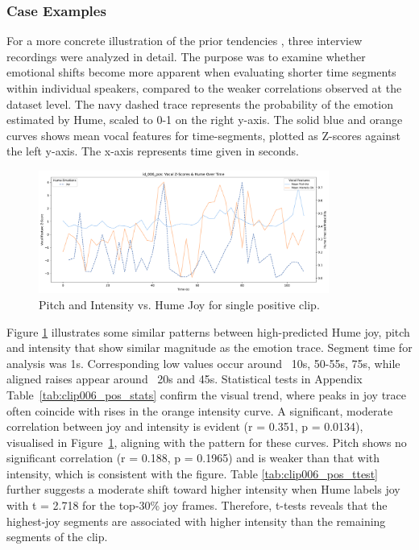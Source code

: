   


\subsubsection{Case Examples}
\label{sec:res_rq1_case}
For a more concrete illustration of the prior tendencies , three interview recordings were analyzed in detail. The purpose was to examine whether emotional shifts become more apparent when evaluating shorter time segments within individual speakers, compared to the weaker correlations observed at the dataset level.
The navy dashed trace represents the probability of the emotion estimated by Hume, scaled to 0-1 on the right y-axis. 
The solid blue and orange curves shows mean vocal features for time-segments, plotted as Z-scores against the left y-axis. The x-axis represents time given in seconds.


\medskip


\begin{figure}[H]
    \centering
    
    \includegraphics[width=0.85\textwidth]{png/results/rq3_2/combined_zscore_hume_id_006_pos_4.pdf}
    \caption{Pitch and Intensity vs. Hume Joy for single positive clip.}
    \label{fig:006_pos-joy}
\end{figure}


  Figure \ref{fig:006_pos-joy} illustrates some similar patterns between high-predicted Hume joy, pitch and intensity that show similar magnitude as the emotion trace. Segment time for analysis was 1s.
  Corresponding low values occur around ~10s, 50-55s, 75s, while aligned raises appear around ~20s and 45s. Statistical tests in Appendix Table~\ref{tab:clip006_pos_stats} confirm the visual trend, where peaks in joy trace often coincide with rises in the orange intensity curve. 
  A significant, moderate correlation between joy and intensity is evident (r = 0.351, p = 0.0134), visualised in Figure~\ref{fig:006_pos-joy}, aligning with the pattern for these curves. 
  Pitch shows no significant correlation (r = 0.188, p = 0.1965) and is weaker than that with intensity, which is consistent with the figure.
  Table \ref{tab:clip006_pos_ttest} further suggests a moderate shift toward higher intensity when Hume labels joy with t = 2.718 for the top-30\% joy frames. Therefore, t-tests reveals that the highest-joy segments are associated with higher intensity than the remaining segments of the clip.

